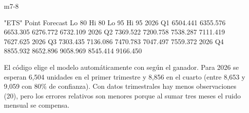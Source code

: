 \begin{solucion}{m7-8}
\begin{rsalida}
[1] "ETS"
        Point Forecast    Lo 80    Hi 80    Lo 95    Hi 95
2026 Q1       6504.441 6355.576 6653.305 6276.772 6732.109
2026 Q2       7369.522 7200.758 7538.287 7111.419 7627.625
2026 Q3       7303.435 7136.086 7470.783 7047.497 7559.372
2026 Q4       8855.932 8652.896 9058.969 8545.414 9166.450
\end{rsalida}

El código elige el modelo automáticamente con  según el
ganador. Para 2026 se esperan 6{,}504 unidades en el primer trimestre y 8{,}856
en el cuarto (entre 8{,}653 y 9{,}059 con 80\% de confianza). Con datos
trimestrales hay menos observaciones (20), pero los errores relativos son
menores porque al sumar tres meses el ruido mensual se compensa.
\end{solucion}

